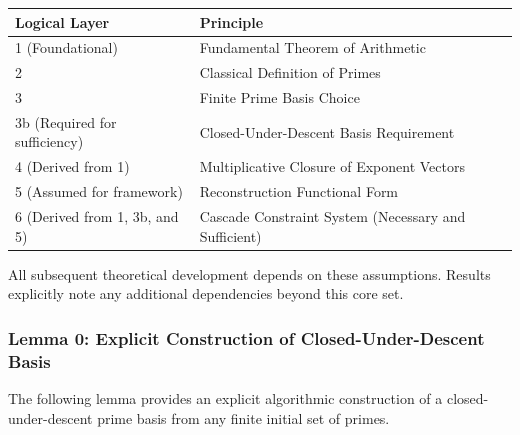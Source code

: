 \begin{center}
\begin{tabular}{|l|l|}
\hline
\textbf{Logical Layer} & \textbf{Principle} \\
\hline
1 (Foundational) & Fundamental Theorem of Arithmetic \\
2 & Classical Definition of Primes \\
3 & Finite Prime Basis Choice \\
3b (Required for sufficiency) & Closed-Under-Descent Basis Requirement \\
4 (Derived from 1) & Multiplicative Closure of Exponent Vectors \\
5 (Assumed for framework) & Reconstruction Functional Form \\
6 (Derived from 1, 3b, and 5) & Cascade Constraint System (Necessary and Sufficient) \\
\hline
\end{tabular}
\end{center}

All subsequent theoretical development depends on these assumptions. Results explicitly note any additional dependencies beyond this core set.

\subsubsection{Lemma 0: Explicit Construction of Closed-Under-Descent Basis}
\label{subsubsec:construction-closed-descent}

The following lemma provides an explicit algorithmic construction of a closed-under-descent prime basis from any finite initial set of primes.

